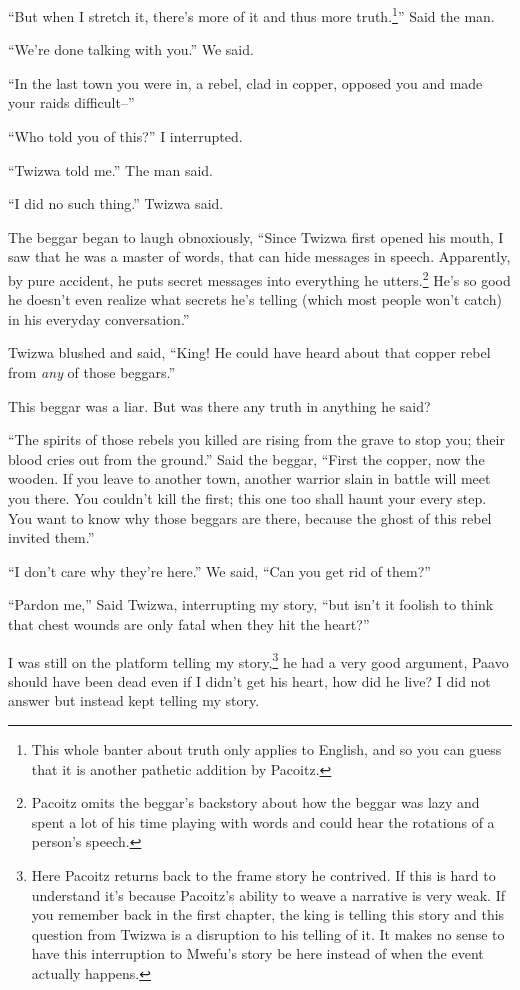 ``But when I stretch it, there's more of it and thus more truth.\footnote{This whole banter about truth only applies to English, and so you can guess that it is another pathetic addition by Pacoitz.}'' Said the man.

``We're done talking with you.'' We said.

``In the last town you were in, a rebel, clad in copper, opposed you and made your raids difficult--''

``Who told you of this?'' I interrupted.

``Twizwa told me.'' The man said.

``I did no such thing.'' Twizwa said.

The beggar began to laugh obnoxiously, ``Since Twizwa first opened his mouth, I saw that he was a master of words, that can hide messages in speech. Apparently, by pure accident, he puts secret messages into everything he utters.\footnote{Pacoitz omits the beggar's backstory about how the beggar was lazy and spent a lot of his time playing with words and could hear the rotations of a person's speech.} He's so good he doesn't even realize what secrets he's telling (which most people won't catch) in his everyday conversation.''

Twizwa blushed and said, ``King! He could have heard about that copper rebel from \emph{any} of those beggars.''

This beggar was a liar. But was there any truth in anything he said?

``The spirits of those rebels you killed are rising from the grave to stop you; their blood cries out from the ground.'' Said the beggar, ``First the copper, now the wooden. If you leave to another town, another warrior slain in battle will meet you there. You couldn't kill the first; this one too shall haunt your every step. You want to know why those beggars are there, because the ghost of this rebel invited them.''
 
``I don't care why they're here.'' We said, ``Can you get rid of them?''

\tbreak

``Pardon me,'' Said Twizwa, interrupting my story, ``but isn't it foolish to think that chest wounds are only fatal when they hit the heart?''

I was still on the platform telling my story,\footnote{Here Pacoitz returns back to the frame story he contrived. If this is hard to understand it's because Pacoitz's ability to weave a narrative is very weak. If you remember back in the first chapter, the king is telling this story and this question from Twizwa is a disruption to his telling of it. It makes no sense to have this interruption to Mwefu's story be here instead of when the event actually happens.} he had a very good argument, Paavo should have been dead even if I didn't get his heart, how did he live? I did not answer but instead kept telling my story.

